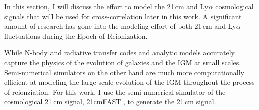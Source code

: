 In this section, I will discuss the effort to model the 21\,cm and Ly$\alpha$
cosmological signals that will be used for cross-correlation later in this work.
A significant amount of research has gone into the modeling effort of both 21\,cm and
Ly$\alpha$ fluctuations during the Epoch of Reionization.

While N-body and radiative transfer codes and analytic models accurately capture
the physics of the evolution of galaxies and the IGM at small scales. Semi-numerical
simulators on the other hand are much more computationally efficient at
modeling the large-scale evolution of the IGM throughout the process of reionziation.
For this work, I use the semi-numerical simulator of the cosmological 21\,cm signal,
21cmFAST \cite{2011MNRAS.411..955M}, to generate the 21\,cm signal.
